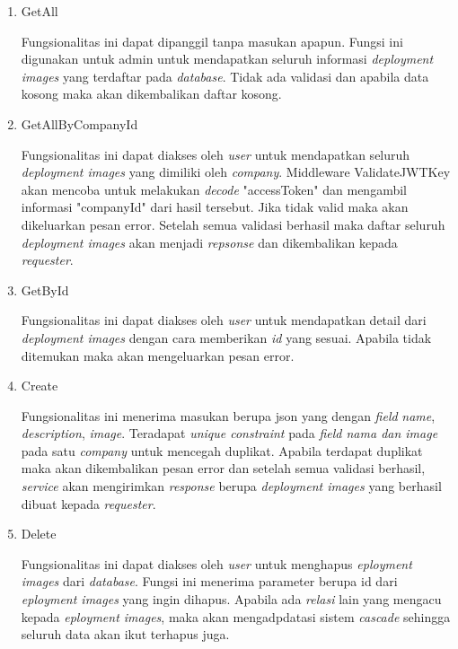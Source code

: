 \pagebreak

\begin{enumerate}
  \item GetAll

        Fungsionalitas ini dapat dipanggil tanpa masukan apapun. Fungsi ini digunakan untuk admin untuk mendapatkan seluruh informasi \textit{deployment images} yang terdaftar pada \textit{database}. Tidak ada validasi dan apabila data kosong maka akan dikembalikan daftar kosong.

  \item GetAllByCompanyId

        Fungsionalitas ini dapat diakses oleh \textit{user} untuk mendapatkan seluruh \textit{deployment images} yang dimiliki oleh \textit{company}. Middleware ValidateJWTKey akan mencoba untuk melakukan \textit{decode} "accessToken" dan mengambil informasi "companyId" dari hasil tersebut. Jika tidak valid maka akan dikeluarkan pesan error. Setelah semua validasi berhasil maka daftar seluruh \textit{deployment images} akan menjadi \textit{repsonse} dan dikembalikan kepada \textit{requester}.

  \item GetById

        Fungsionalitas ini dapat diakses oleh \textit{user} untuk mendapatkan detail dari \textit{deployment images} dengan cara memberikan \textit{id} yang sesuai. Apabila tidak ditemukan maka akan mengeluarkan pesan error.

  \item Create

        Fungsionalitas ini menerima masukan berupa json yang dengan \textit{field} \textit{name}, \textit{description}, \textit{image}. Teradapat \textit{unique constraint} pada \textit{field nama dan image} pada satu \textit{company} untuk mencegah duplikat. Apabila terdapat duplikat maka akan dikembalikan pesan error dan setelah semua validasi berhasil, \textit{service} akan mengirimkan \textit{response} berupa \textit{deployment images} yang berhasil dibuat kepada \textit{requester}.

  \item Delete

        Fungsionalitas ini dapat diakses oleh \textit{user} untuk menghapus \textit{eployment images} dari \textit{database}. Fungsi ini menerima parameter berupa id dari \textit{eployment images} yang ingin dihapus. Apabila ada \textit{relasi} lain yang mengacu kepada \textit{eployment images}, maka akan mengadpdatasi sistem \textit{cascade} sehingga seluruh data akan ikut terhapus juga.

\end{enumerate}

